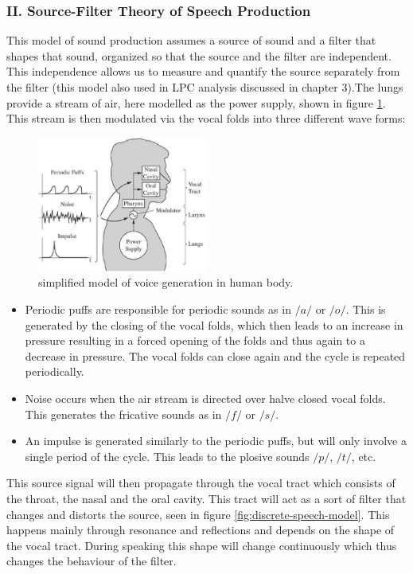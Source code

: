 \documentclass[12pt, a4paper, twoside]{report}
\begin{document}
\subsubsection{II. Source-Filter Theory of Speech Production}

This model of sound production assumes a source of sound and a filter that shapes that sound, organized so that the source and the filter are independent. This independence allows us to measure and quantify the source separately from the filter (this model also used in LPC analysis discussed in chapter 3).The lungs provide a stream of air, here modelled as the power supply, shown in figure \ref{fig:simple-model-voice-gen}. This stream is then modulated via the vocal folds into three different wave forms:
\begin{figure}[!h]
	\centering
	\includegraphics[width=0.5\textwidth]
	{images/chapter2/simple-model-voice-gen}
	\caption{simplified model of voice generation in human body.}
	\label{fig:simple-model-voice-gen}
\end{figure}

\begin{itemize}[noitemsep]
\item Periodic puffs are responsible for periodic sounds as in $/a/$ or $/o/$. This is generated by the closing of the vocal folds, which then leads to an increase in pressure resulting in a forced opening of the folds and thus again to a decrease in pressure. The vocal folds can close again and the cycle is repeated periodically.
\item Noise occurs when the air stream is directed over halve closed vocal folds. This generates the fricative sounds as in $/f/$ or $/s/$.
\item An impulse is generated similarly to the periodic puffs, but will only involve a single period of the cycle. This leads to the plosive sounds $/p/$, $/t/$, etc.
\end{itemize}
This source signal will then propagate through the vocal tract which consists of the throat, the nasal and the oral cavity. This tract will act as a sort of filter that changes and distorts the source, seen in figure \ref{fig:discrete-speech-model}. This happens mainly through resonance and reflections and depends on the shape of the vocal tract. During speaking this shape will change continuously which thus changes the behaviour of the filter.
\end{document}
